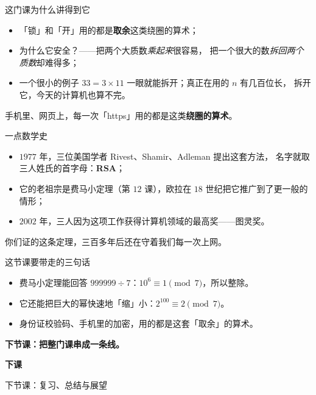 \documentclass[10pt]{beamer}
\begin{document}
\begin{frame}{这门课为什么讲得到它}
  \begin{itemize}
    \item 「锁」和「开」用的都是\textbf{取余}这类绕圈的算术；
    \item 为什么它安全？——把两个大质数\emph{乘起来}很容易，
          把一个很大的数\emph{拆回两个质数}却难得多；
    \item 一个很小的例子 \(33=3\times11\) 一眼就能拆开；真正在用的 \(n\) 有几百位长，
          拆开它，今天的计算机也算不完。
  \end{itemize}
  \pause
  \begin{center}
    {\large 手机里、网页上，每一次「https」用的都是这类\textbf{绕圈的算术}。}
  \end{center}
\end{frame}

\begin{frame}{一点数学史}
  \begin{itemize}
    \item \(1977\) 年，三位美国学者 Rivest、Shamir、Adleman 提出这套方法，
          名字就取三人姓氏的首字母：\textbf{RSA}；
    \item 它的老祖宗是费马小定理（第 \(12\) 课），欧拉在 \(18\) 世纪把它推广到了更一般的情形；
    \item \(2002\) 年，三人因为这项工作获得计算机领域的最高奖——图灵奖。
  \end{itemize}
  \pause
  \begin{center}
    {\large 你们证的这条定理，三百多年后还在守着我们每一次上网。}
  \end{center}
\end{frame}


\begin{frame}{这节课要带走的三句话}
  \begin{itemize}
    \item 费马小定理能回答 \(999999\div7\)：\(10^{6}\equiv1\pmod 7\)，所以整除。
    \item 它还能把巨大的幂快速地「缩」小：\(2^{100}\equiv2\pmod 7\)。
    \item 身份证校验码、手机里的加密，用的都是这套「取余」的算术。
  \end{itemize}
  \pause
  \begin{center}
    {\large\textcolor{textgreen}{\bfseries 下节课：把整门课串成一条线。}}
  \end{center}
\end{frame}

\begin{frame}
  \begin{center}
    \vspace{1.6cm}
    {\Large\textcolor{textgreen}{\bfseries 下课}}

    \vspace{1.0cm}
    {\large\textcolor{accentgreen}{下节课：复习、总结与展望}}
  \end{center}
\end{frame}
\end{document}
